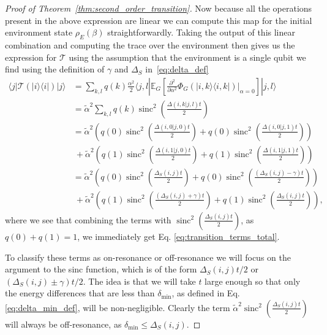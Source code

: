 \documentclass[
 amsmath,amssymb,
 aps,
onecolumn, 
nofootinbib]{revtex4-2}
\newcommand{\ket}[1]{|#1\rangle}
\newcommand{\bra}[1]{\langle #1|}
\newcommand{\ketbra}[2]{| #1\rangle\! \langle #2|}
\DeclareMathOperator{\sinc}{sinc}
\begin{document}
\begin{proof}[Proof of Theorem~\ref{thm:second_order_transition}]
    Now because all the operations present in the above expression are linear we can compute this map for the initial environment state $\rho_E(\beta)$ straightforwardly. Taking the output of this linear combination and computing the trace over the environment then gives us the expression for $\mathcal{T}$ using the assumption that the environment is a single qubit we find using the definition of $\gamma$ and $\Delta_S$ in~\eqref{eq:delta_def}
    \begin{align}
        \bra{j} \mathcal{T}(\ketbra{i}{i}) \ket{j} &= \sum_{k, l} q(k) \frac{\alpha^2}{2}\bra{j, l} \mathbb{E}_G \left[ \frac{\partial^2}{\partial \alpha^2} \Phi_G(\ketbra{i, k}{i,k}) \big|_{\alpha = 0} \right] \ket{j, l} \\
        &= \widetilde{\alpha}^2 \sum_{k, l} q(k) \sinc^2 \left(\frac{\Delta(i, k | j , l) t}{2} \right) \\
        &= \widetilde{\alpha}^2 \left(q(0) \sinc^2 \left(\frac{\Delta(i, 0 | j , 0) t}{2} \right) + q(0) \sinc^2 \left(\frac{\Delta(i, 0 | j , 1) t}{2} \right) \right) \nonumber \\
        & ~+ \widetilde{\alpha}^2 \left(q(1) \sinc^2 \left(\frac{\Delta(i, 1 | j , 0) t}{2} \right) + q(1) \sinc^2 \left(\frac{\Delta(i, 1 | j , 1) t}{2} \right) \right) \\
        &= \widetilde{\alpha}^2 \left(q(0) \sinc^2 \left(\frac{\Delta_S(i,j) t}{2} \right) + q(0) \sinc^2 \left(\frac{(\Delta_S(i,j) - \gamma) t}{2} \right) \right) \nonumber \\
        & ~+ \widetilde{\alpha}^2 \left(q(1) \sinc^2 \left(\frac{(\Delta_S(i, j) + \gamma) t}{2} \right) + q(1) \sinc^2 \left(\frac{\Delta_S(i,j) t}{2} \right) \right),
    \end{align}
    where we see that combining the terms with $\sinc^2 \left(\frac{\Delta_S(i,j) t}{2} \right)$, as $q(0) + q(1) = 1$, we immediately get Eq. \eqref{eq:transition_terms_total}. 

    To classify these terms as on-resonance or off-resonance we will focus on the argument to the sinc function, which is of the form $\Delta_S(i,j) t/ 2$ or $(\Delta_S(i,j) \pm \gamma) t/ 2$. The idea is that we will take $t$ large enough so that only the energy differences that are less than $\delta_{\min}$, as defined in Eq. \eqref{eq:delta_min_def}, will be non-negligible. Clearly the term $\widetilde{\alpha}^2 \sinc^2 \left( \frac{\Delta_S(i,j)t}{2} \right)$ will always be off-resonance, as $\delta_{\min} \le \Delta_S(i,j)$. 
    

\end{proof}
\end{document}
